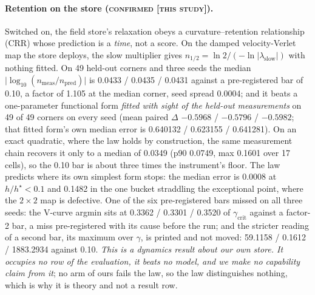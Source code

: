 \documentclass{article} %
\begin{document}
\paragraph{Retention on the store (\textsc{confirmed [this study]}).} Switched on, the field
store's relaxation obeys a curvature--retention relationship (CRR) whose prediction is a
\emph{time}, not a score. On the damped velocity-Verlet map the store deploys, the slow
multiplier gives $n_{1/2}=\ln2/(-\ln\lvert\lambda_{\text{slow}}\rvert)$ with nothing fitted. On 49
held-out corners and three seeds the median $\lvert\log_{10}(n_{\text{meas}}/n_{\text{pred}})\rvert$ is
0.0433 / 0.0435 / 0.0431 against a pre-registered bar of 0.10, a factor of 1.105 at the median
corner, seed spread 0.0004; and it beats a one-parameter functional form \emph{fitted with sight
of the held-out measurements} on 49 of 49 corners on every seed (mean paired $\Delta$ $-0.5968$ /
$-0.5796$ / $-0.5982$; that fitted form's own median error is 0.640132 / 0.623155 / 0.641281).
On an exact quadratic, where the law holds by construction, the same measurement chain recovers it
only to a median of 0.0349 (p90 0.0749, max 0.1601 over 17 cells), so the 0.10 bar is about three
times the instrument's floor. %
The law predicts where its own simplest form stops: the median error is 0.0008 at $h/h^\star<0.1$
and 0.1482 in the one bucket straddling the exceptional point, where the $2\times2$ map is
defective. %
One of the six pre-registered bars missed on all three seeds: the V-curve argmin sits at 0.3362 /
0.3301 / 0.3520 of $\gamma_{\text{crit}}$ against a factor-2 bar, a miss pre-registered with its
cause before the run; and the stricter reading of a second bar, its maximum over $\gamma$, is
printed and not moved: 59.1158 / 0.1612 / 1883.2934 against 0.10.
\emph{This is a dynamics result about our own store. It occupies no row of the evaluation, it
beats no model, and we make no capability claim from it}; no arm of ours fails the law, so the law
distinguishes nothing, which is why it is theory and not a result row.
\end{document}
